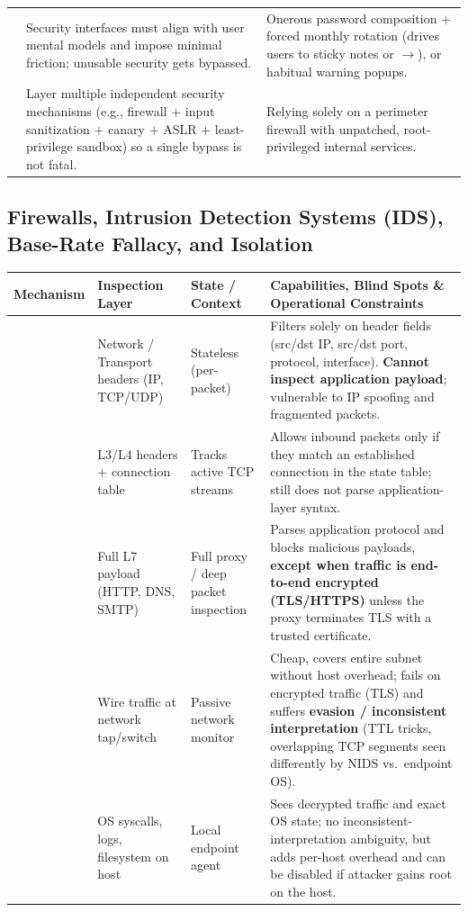 \begin{table}[h!]
\begin{tabularx}{\textwidth}{@{}L{3.1cm} Y Y@{}}
 & Security interfaces must align with user mental models and impose minimal friction; unusable security gets bypassed. & Onerous password composition + forced monthly rotation (drives users to sticky notes or $\to$), or habitual warning popups. \\
 & Layer multiple independent security mechanisms (e.g., firewall $+$ input sanitization $+$ canary $+$ ASLR $+$ least-privilege sandbox) so a single bypass is not fatal. & Relying solely on a perimeter firewall with unpatched, root-privileged internal services. \\
\bottomrule
\end{tabularx}
\end{table}

\subsection{Firewalls, Intrusion Detection Systems (IDS), Base-Rate Fallacy, and Isolation}

\begin{table}[h!]
\centering
\footnotesize
\begin{tabularx}{\textwidth}{@{}L{3.2cm} L{3.2cm} L{2.8cm} Y@{}}
\toprule
\textbf{Mechanism} & \textbf{Inspection Layer} & \textbf{State / Context} & \textbf{Capabilities, Blind Spots \& Operational Constraints} \\
\midrule
{} & Network / Transport headers (IP, TCP/UDP) & Stateless (per-packet) & Filters solely on header fields (src/dst IP, src/dst port, protocol, interface). \textbf{Cannot inspect application payload}; vulnerable to IP spoofing and fragmented packets. \\
 & L3/L4 headers $+$ connection table & Tracks active TCP streams & Allows inbound packets only if they match an established connection in the state table; still does not parse application-layer syntax. \\
 & Full L7 payload (HTTP, DNS, SMTP) & Full proxy / deep packet inspection & Parses application protocol and blocks malicious payloads, \textbf{except when traffic is end-to-end encrypted (TLS/HTTPS)} unless the proxy terminates TLS with a trusted certificate. \\
 & Wire traffic at network tap/switch & Passive network monitor & Cheap, covers entire subnet without host overhead; fails on encrypted traffic (TLS) and suffers \textbf{evasion / inconsistent interpretation} (TTL tricks, overlapping TCP segments seen differently by NIDS vs.\ endpoint OS). \\
 & OS syscalls, logs, filesystem on host & Local endpoint agent & Sees decrypted traffic and exact OS state; no inconsistent-interpretation ambiguity, but adds per-host overhead and can be disabled if attacker gains root on the host. \\
\bottomrule
\end{tabularx}
\end{table}

